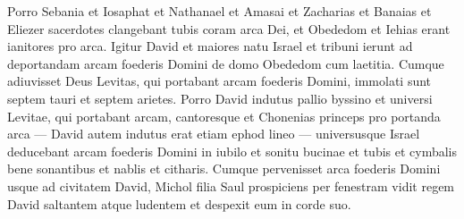 \begin{biblechapter}
\begin{biblechapter}
\begin{biblechapter}
\begin{biblechapter}
\begin{biblechapter}
\begin{biblechapter}
\begin{biblechapter}
\begin{biblechapter}
\begin{biblechapter}
\begin{biblechapter}
\begin{biblechapter}
\begin{biblechapter}
\begin{biblechapter}
\begin{biblechapter}
\begin{biblechapter}
\verse Porro Sebania et Iosaphat et Nathanael et Amasai et Zacharias et Banaias et Eliezer sacerdotes clangebant tubis coram arca Dei, et Obededom et Iehias erant ianitores pro arca.
 \verse Igitur David et maiores natu Israel et tribuni ierunt ad deportandam arcam foederis Domini de domo Obededom cum laetitia. 
\verse Cumque adiuvisset Deus Levitas, qui portabant arcam foederis Domini, immolati sunt septem tauri et septem arietes. 
\verse Porro David indutus pallio byssino et universi Levitae, qui portabant arcam, cantoresque et Chonenias princeps pro portanda arca — David autem indutus erat etiam ephod lineo — 
\verse universusque Israel deducebant arcam foederis Domini in iubilo et sonitu bucinae et tubis et cymbalis bene sonantibus et nablis et citharis. 
\verse Cumque pervenisset arca foederis Domini usque ad civitatem David, Michol filia Saul prospiciens per fenestram vidit regem David saltantem atque ludentem et despexit eum in corde suo.
 

\end{biblechapter}
\end{biblechapter}
\end{biblechapter}
\end{biblechapter}
\end{biblechapter}
\end{biblechapter}
\end{biblechapter}
\end{biblechapter}
\end{biblechapter}
\end{biblechapter}
\end{biblechapter}
\end{biblechapter}
\end{biblechapter}
\end{biblechapter}
\end{biblechapter}
